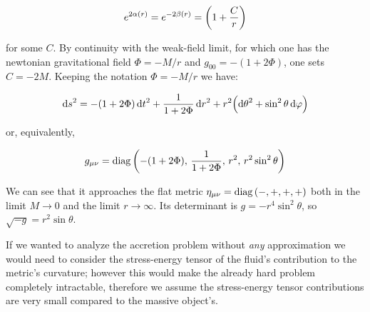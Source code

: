 \documentclass[main.tex]{subfiles}
\begin{document}
\begin{equation}
  e^{2 \alpha(r)} = e^{-2 \beta(r)} = \qty(1 + \frac{C}{r})
\end{equation}

for some \(C\). By continuity with the weak-field limit, for which one has the newtonian gravitational field \(\Phi = -M/r\) and \(g_{00} = - (1 + 2 \Phi)\), one sets \(C = -2M\).
Keeping the notation \(\Phi = -M/r\) we have:

\begin{equation}
    \dd{s}^2 = -(1+2\Phi)\dd{t}^2 + \frac{1}{1+2\Phi} \dd{r}^2
    + r^2 \qty(\dd{\theta}^2 + \sin^2\theta \dd{\varphi}) \label{eq:schwartzshild-line-element}
\end{equation}

or, equivalently,

\begin{equation}
    g_{\mu\nu} =  \diag\qty(-(1+2\Phi),\, \frac{1}{1+2\Phi},\, r^2,\, r^2 \sin ^2 \theta )
\end{equation}

We can see that it approaches the flat metric $\eta_{\mu\nu} = \operatorname{diag}\qty(-, +, +, +)$ both in the limit $M\rightarrow 0$ and the limit \(r \rightarrow \infty\). Its determinant is $g = -r^4 \sin^2 \theta$, so \(\sqrt{-g} = r^2 \sin \theta \).

If we wanted to analyze the accretion problem without \emph{any} approximation we would need to consider the stress-energy tensor of the fluid's contribution to the metric's curvature; however this would make the already hard problem completely intractable, therefore we assume the stress-energy tensor contributions are very small compared to the massive object's.
\end{document}
